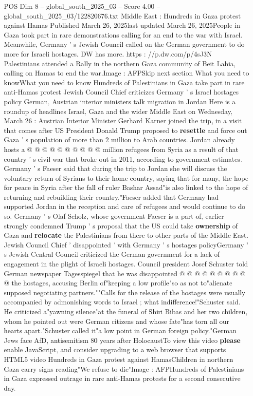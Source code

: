 \begin{textsample}{POS Dim 8 – global\_south\_2025\_03 – Score 4.00 – global\_south\_2025\_03/122820676.txt}  \label{ex:f8_pos_146}
Middle East : Hundreds in Gaza protest against Hamas Published March 26, 2025last updated March 26, 2025People in Gaza took part in rare demonstrations calling for an end to the war with Israel.
Meanwhile, Germany ' s Jewish Council called on the German government to do more for Israeli hostages.
DW has more. https : //p.dw.com/p/4sJ3N Palestinians attended a Rally in the northern Gaza community of Beit Lahia, calling on Hamas to end the war.Image : AFPSkip next section What you need to knowWhat you need to know Hundreds of Palestinians in Gaza take part in rare anti-Hamas protest Jewish Council Chief criticizes Germany ' s Israel hostages policy German, Austrian interior ministers talk migration in Jordan Here is a roundup of headlines Israel, Gaza and the wider Middle East on Wednesday, March 26 : Austrian Interior Minister Gerhard Karner joined the trip, in a visit that comes after US President Donald Trump proposed to \textbf{resettle} and force out Gaza ' s population of more than 2 million to Arab countries.
Jordan already hosts a @ @ @ @ @ @ @ @ @ @ million refugees from Syria as a result of that country ' s civil war that broke out in 2011, according to government estimates.
Germany ' s Faeser said that during the trip to Jordan she will discuss the voluntary return of Syrians to their home country, saying that for many, the hope for peace in Syria after the fall of ruler Bashar Assad"is also linked to the hope of returning and rebuilding their country."Faeser added that Germany had supported Jordan in the reception and care of refugees and would continue to do so.
Germany ' s Olaf Scholz, whose government Faeser is a part of, earlier strongly condemned Trump ' s proposal that the US could take \textbf{ownership} of Gaza and \textbf{relocate} the Palestinians from there to other parts of the Middle East.
Jewish Council Chief ' disappointed ' with Germany ' s hostages policyGermany ' s Jewish Central Council criticized the German government for a lack of engagement in the plight of Israeli hostages.
Council president Josef Schuster told German newspaper Tagesspiegel that he was disappointed @ @ @ @ @ @ @ @ @ @ the hostages, accusing Berlin of"keeping a low profile"so as not to"alienate supposed negotiating partners.""Calls for the release of the hostages were usually accompanied by admonishing words to Israel ; what indifference!"Schuster said.
He criticized a"yawning silence"at the funeral of Shiri Bibas and her two children, whom he pointed out were German citizens and whose fate"has torn all our hearts apart."Schuster called it"a low point in German foreign policy."German Jews face AfD, antisemitism 80 years after HolocaustTo view this video \textbf{please} enable JavaScript, and consider upgrading to a web browser that supports HTML5 video Hundreds in Gaza protest against HamasChildren in northern Gaza carry signs reading"We refuse to die"Image : AFPHundreds of Palestinians in Gaza expressed outrage in rare anti-Hamas protests for a second consecutive day.

\end{textsample}
